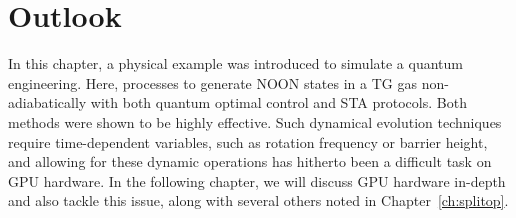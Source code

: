 \section{Outlook}

In this chapter, a physical example was introduced to simulate a quantum engineering.
Here, processes to generate NOON states in a TG gas non-adiabatically with both quantum optimal control and STA protocols.
Both methods were shown to be highly effective.
Such dynamical evolution techniques require time-dependent variables, such as rotation frequency or barrier height, and allowing for these dynamic operations has hitherto been a difficult task on GPU hardware.
In the following chapter, we will discuss GPU hardware in-depth and also tackle this issue, along with several others noted in Chapter~\ref{ch:splitop}.


